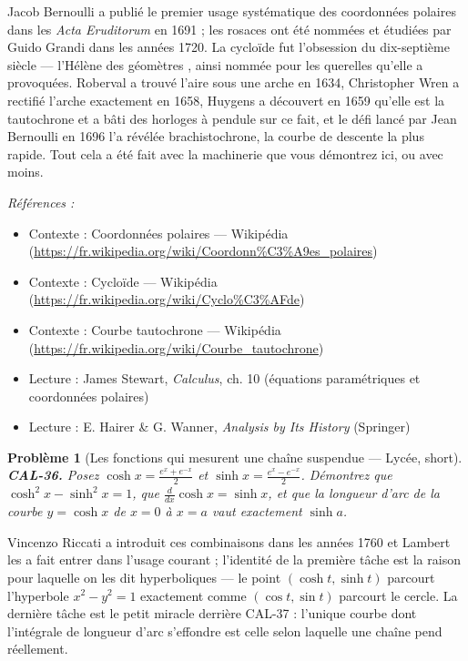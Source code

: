 \documentclass[11pt]{article}
\newtheorem{problem}{Problème}
\newenvironment{refs}{\par\small\noindent\emph{Références :}\begin{itemize}\setlength\itemsep{0pt}}{\end{itemize}\normalsize}
\begin{document}
\noindent Jacob Bernoulli a publié le premier usage systématique des coordonnées polaires dans les
\textit{Acta Eruditorum} en 1691 ; les rosaces ont été nommées et étudiées par Guido Grandi dans les
années 1720. La cycloïde fut l'obsession du dix-septième siècle --- \og{} l'Hélène des
géomètres \fg{}, ainsi nommée pour les querelles qu'elle a provoquées. Roberval a trouvé l'aire sous une arche en
1634, Christopher Wren a rectifié l'arche exactement en 1658, Huygens a découvert en 1659 qu'elle est
la tautochrone et a bâti des horloges à pendule sur ce fait, et le défi lancé par Jean Bernoulli en 1696
l'a révélée brachistochrone, la courbe de descente la plus rapide. Tout cela a été fait
avec la machinerie que vous démontrez ici, ou avec moins.

\begin{refs}
\item Contexte : Coordonnées polaires --- Wikipédia (\url{https://fr.wikipedia.org/wiki/Coordonn%C3%A9es_polaires})
\item Contexte : Cycloïde --- Wikipédia (\url{https://fr.wikipedia.org/wiki/Cyclo%C3%AFde})
\item Contexte : Courbe tautochrone --- Wikipédia (\url{https://fr.wikipedia.org/wiki/Courbe_tautochrone})
\item Lecture : James Stewart, \textit{Calculus}, ch. 10 (équations paramétriques et coordonnées polaires)
\item Lecture : E. Hairer \& G. Wanner, \textit{Analysis by Its History} (Springer)
\end{refs}

\bigskip

\begin{problem}[{Les fonctions qui mesurent une chaîne suspendue --- Lycée, short}]
\textbf{CAL-36.} Posez
$ \cosh x = \frac{e^x + e^{-x}}{2} $ et $ \sinh x = \frac{e^x - e^{-x}}{2} $. Démontrez que
$ \cosh^2 x - \sinh^2 x = 1 $, que $ \frac{d}{dx}\cosh x = \sinh x $, et que la longueur
d'arc de la courbe $ y = \cosh x $ de $ x = 0 $ à $ x = a $ vaut exactement
$ \sinh a $.
\end{problem}

\noindent Vincenzo Riccati a introduit ces combinaisons dans les années 1760 et Lambert
les a fait entrer dans l'usage courant ; l'identité de la première tâche est la raison pour laquelle on les dit hyperboliques
--- le point $ (\cosh t, \sinh t) $ parcourt l'hyperbole $ x^2 - y^2 = 1 $ exactement comme
$ (\cos t, \sin t) $ parcourt le cercle. La dernière tâche est le petit miracle derrière CAL-37 :
l'unique courbe dont l'intégrale de longueur d'arc s'effondre est celle selon laquelle une chaîne pend réellement.
\end{document}
